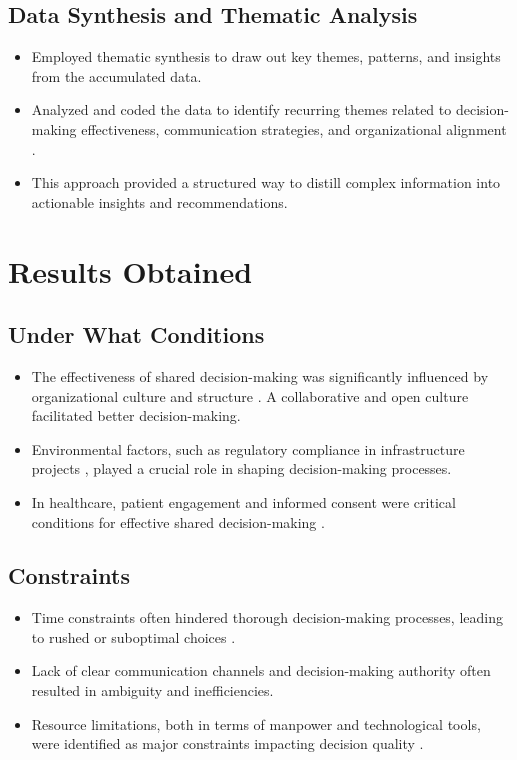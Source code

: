 \documentclass[12pt]{article}
\begin{document}
\subsection{Data Synthesis and Thematic Analysis}
\begin{itemize}
  \item Employed thematic synthesis to draw out key themes, patterns, and insights from the accumulated data.
  \item Analyzed and coded the data to identify recurring themes related to decision-making effectiveness, communication strategies, and organizational alignment \cite{reference10}.
  \item This approach provided a structured way to distill complex information into actionable insights and recommendations.
\end{itemize}

\newpage

\section{Results Obtained}

\subsection{Under What Conditions}
\begin{itemize}
  \item The effectiveness of shared decision-making was significantly influenced by organizational culture and structure \cite{reference3}. A collaborative and open culture facilitated better decision-making.
  \item Environmental factors, such as regulatory compliance in infrastructure projects \cite{reference1}, played a crucial role in shaping decision-making processes.
  \item In healthcare, patient engagement and informed consent were critical conditions for effective shared decision-making \cite{reference2}.
\end{itemize}

\subsection{Constraints}
\begin{itemize}
  \item Time constraints often hindered thorough decision-making processes, leading to rushed or suboptimal choices \cite{reference7}.
  \item Lack of clear communication channels and decision-making authority \cite{reference6} often resulted in ambiguity and inefficiencies.
  \item Resource limitations, both in terms of manpower and technological tools, were identified as major constraints impacting decision quality \cite{reference9}.
\end{itemize}
\end{document}
